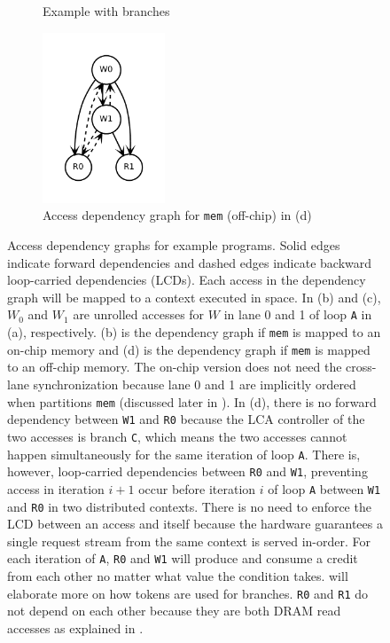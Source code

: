 \begin{figure}
\begin{subfigure}[b]{0.4\textwidth}
\inputminted{python}{code/dep3.py}
\caption{Example with branches}
\end{subfigure}
\begin{subfigure}[b]{0.5\textwidth}
  \centering
\includegraphics[width=0.4\textwidth]{figs/dep3.pdf}
  \caption{Access dependency graph for \texttt{mem} (off-chip) in (d)}
\end{subfigure}

\caption[Access dependency graph]{
  Access dependency graphs for example programs. 
  Solid edges indicate forward dependencies and
  dashed edges indicate backward loop-carried dependencies (LCDs).
  Each access in the dependency graph will be mapped to a context executed in space. 
  In (b) and (c),
  \texttt{$W_0$} and \texttt{$W_1$} are unrolled accesses for $W$ in lane 0 and 1 of loop \texttt{A}
  in (a), respectively.
  (b) is the dependency graph if \texttt{mem} is mapped to an on-chip memory and (d)
  is the dependency graph if \texttt{mem} is mapped to an off-chip memory.
  The on-chip version does not need the cross-lane synchronization because 
  lane 0 and 1 are implicitly ordered when \name partitions \texttt{mem} 
  (discussed later in ).
  In (d), there is no forward dependency between \texttt{W1} and \texttt{R0} because the LCA controller
  of the two accesses is branch \texttt{C}, which means the two accesses cannot happen simultaneously 
  for the same iteration of loop \texttt{A}.
  There is, however, loop-carried dependencies between \texttt{R0} and \texttt{W1}, preventing access
  in iteration $i+1$ occur before iteration $i$ of loop \texttt{A} between \texttt{W1} and \texttt{R0} in
  two distributed contexts.
  There is no need to enforce the LCD between an access and itself because 
  the hardware guarantees a single request stream from the same context is served in-order.
  For each iteration of \texttt{A}, \texttt{R0} and \texttt{W1} will produce and consume a credit from
  each other no matter what value the condition takes. 
   will elaborate more on how tokens are used for branches.
  \texttt{R0} and \texttt{R1} do not depend on each other because they are both DRAM read accesses as explained in .
}
\label{fig:depeg}
\end{figure}

